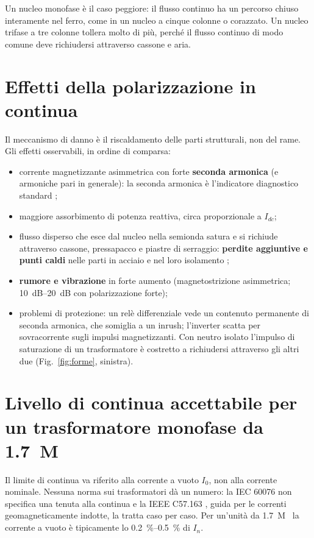 \documentclass[10pt,a4paper]{scrartcl}
\newcommand{\Idc}{I_{dc}}
\newcommand{\Izero}{I_0}
\begin{document}
\begin{onehalfspace}
Un nucleo monofase è il caso peggiore: il flusso continuo ha un percorso chiuso interamente nel ferro, come in un nucleo a cinque colonne o corazzato. Un nucleo trifase a tre colonne tollera molto di più, perché il flusso continuo di modo comune deve richiudersi attraverso cassone e aria.

\section{Effetti della polarizzazione in continua}
\label{sec:effetti}

Il meccanismo di danno è il riscaldamento delle parti strutturali, non del rame. Gli effetti osservabili, in ordine di comparsa:
\begin{itemize}
\item corrente magnetizzante asimmetrica con forte \textbf{seconda armonica} (e armoniche pari in generale): la seconda armonica è l'indicatore diagnostico standard \cite{walling1991};
\item maggiore assorbimento di potenza reattiva, circa proporzionale a $\Idc$;
\item flusso disperso che esce dal nucleo nella semionda satura e si richiude attraverso cassone, pressapacco e piastre di serraggio: \textbf{perdite aggiuntive e punti caldi} nelle parti in acciaio e nel loro isolamento \cite{price2002};
\item \textbf{rumore e vibrazione} in forte aumento (magnetostrizione asimmetrica; \SIrange{10}{20}{dB} con polarizzazione forte);
\item problemi di protezione: un relè differenziale vede un contenuto permanente di seconda armonica, che somiglia a un inrush; l'inverter scatta per sovracorrente sugli impulsi magnetizzanti. Con neutro isolato l'impulso di saturazione di un trasformatore è costretto a richiudersi attraverso gli altri due (Fig.~\ref{fig:forme}, sinistra).
\end{itemize}

\section{Livello di continua accettabile per un trasformatore monofase da \SI{1.7}{M\VA}}
\label{sec:limiti}

Il limite di continua va riferito alla corrente a vuoto $\Izero$, non alla corrente nominale. Nessuna norma sui trasformatori dà un numero: la IEC 60076 \cite{iec60076} non specifica una tenuta alla continua e la IEEE C57.163 \cite{ieeec57163}, guida per le correnti geomagneticamente indotte, la tratta caso per caso. Per un'unità da \SI{1.7}{M\VA} la corrente a vuoto è tipicamente lo \SIrange{0.2}{0.5}{\percent} di $I_n$.


\end{onehalfspace}
\end{document}
